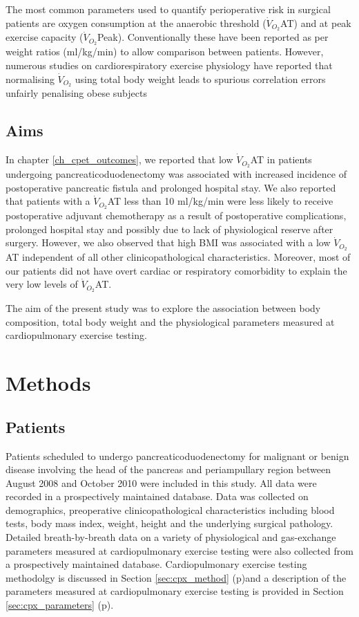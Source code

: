 The most common parameters used to quantify perioperative risk in surgical patients are oxygen consumption at the anaerobic threshold ($\dot{V}_{O_2}$AT) and at peak exercise capacity ($\dot{V}_{O_2}$Peak). 
Conventionally these have been reported as per weight ratios (ml/kg/min) to allow comparison between patients. 
However, numerous studies on cardiorespiratory exercise physiology have reported that normalising $\dot{V}_{O_2}$ using total body weight leads to spurious correlation errors unfairly penalising obese subjects \parencite{seltzer_body_1940, tanner_fallacy_1949, toth_examination_1993, batterham_modeling_1999, goran_total_2000, krachler_cardiopulmonary_2014} 

\subsection{Aims}
In chapter \ref{ch_cpet_outcomes}, we reported that low $\dot{V}_{O_2}$AT in patients undergoing pancreaticoduodenectomy was associated with increased incidence of postoperative pancreatic fistula and prolonged hospital stay. 
We also reported that patients with a $\dot{V}_{O_2}$AT less than 10 ml/kg/min were less likely to receive postoperative adjuvant chemotherapy as a result of postoperative complications, prolonged hospital stay and possibly due to lack of physiological reserve after surgery. 
However, we also observed that high BMI was associated with a low $\dot{V}_{O_2}$AT independent of all other clinicopathological characteristics. 
Moreover, most of our patients did not have overt cardiac or respiratory comorbidity to explain the very low levels of $\dot{V}_{O_2}$AT.

The aim of the present study was to explore the association between body composition, total body weight and the physiological parameters measured at cardiopulmonary exercise testing.

\clearpage
\section{Methods}

\subsection{Patients}
Patients scheduled to undergo pancreaticoduodenectomy for malignant or benign disease involving the head of the pancreas and periampullary region between August 2008 and October 2010 were included in this study. 
All data were recorded in a prospectively maintained database. 
Data was collected on demographics, preoperative clinicopathological characteristics including blood tests, body mass index, weight, height and the underlying surgical pathology. 
Detailed breath-by-breath data on a variety of physiological and gas-exchange parameters measured at cardiopulmonary exercise testing were also collected from a prospectively maintained database. 
Cardiopulmonary exercise testing methodolgy is discussed in Section \ref{sec:cpx_method} (p\pageref{sec:cpx_parameters})and a description of the parameters measured at cardiopulmonary exercise testing is provided in Section \ref{sec:cpx_parameters} (p\pageref{sec:cpx_parameters}).

